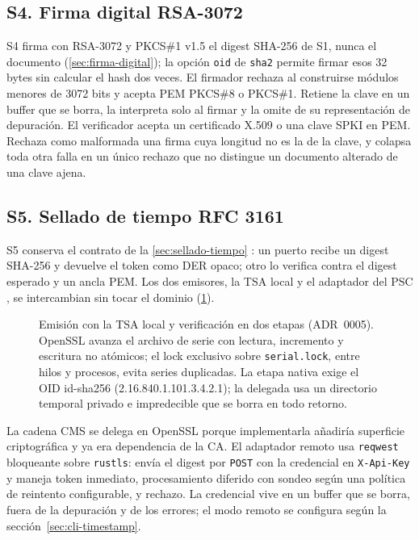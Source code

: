 \subsection{S4. Firma digital RSA-3072}\label{sec:impl-s4-firma}

S4 firma con RSA-3072 y PKCS\#1 v1.5 el digest SHA-256 de S1, nunca el documento (\cref{sec:firma-digital}); la opción \texttt{oid} de \texttt{sha2} permite firmar esos 32 bytes sin calcular el hash dos veces. El firmador rechaza al construirse módulos menores de 3072 bits y acepta PEM PKCS\#8 o PKCS\#1. Retiene la clave en un buffer que se borra, la interpreta solo al firmar y la omite de su representación de depuración. El verificador acepta un certificado X.509 o una clave SPKI en PEM. Rechaza como malformada una firma cuya longitud no es la de la clave, y colapsa toda otra falla en un único rechazo que no distingue un documento alterado de una clave ajena.

\subsection{S5. Sellado de tiempo RFC 3161}\label{sec:impl-s5-sellado}

S5 conserva el contrato de la \cref{sec:sellado-tiempo} \cite{adams2001}: un puerto recibe un digest SHA-256 y devuelve el token como DER opaco; otro lo verifica contra el digest esperado y un ancla PEM. Los dos emisores, la TSA local y el adaptador del PSC \cite{cincel2024}, se intercambian sin tocar el dominio (\cref{fig:impl-tsa-local}).

\begin{figure}[!tb]
  \centering
  
  \caption{Emisión con la TSA local y verificación en dos etapas (ADR~0005). OpenSSL avanza el archivo de serie con lectura, incremento y escritura no atómicos; el lock exclusivo sobre \texttt{serial.lock}, entre hilos y procesos, evita series duplicadas. La etapa nativa exige el OID id-sha256 (2.16.840.1.101.3.4.2.1); la delegada usa un directorio temporal privado e impredecible que se borra en todo retorno.}
  \label{fig:impl-tsa-local}
\end{figure}

La cadena CMS se delega en OpenSSL porque implementarla añadiría superficie criptográfica y ya era dependencia de la CA. El adaptador remoto usa \texttt{reqwest} bloqueante sobre \texttt{rustls}: envía el digest por \texttt{POST} con la credencial en \texttt{X-Api-Key} y maneja token inmediato, procesamiento diferido con sondeo según una política de reintento configurable, y rechazo. La credencial vive en un buffer que se borra, fuera de la depuración y de los errores; el modo remoto se configura según la sección~\ref{sec:cli-timestamp}.

